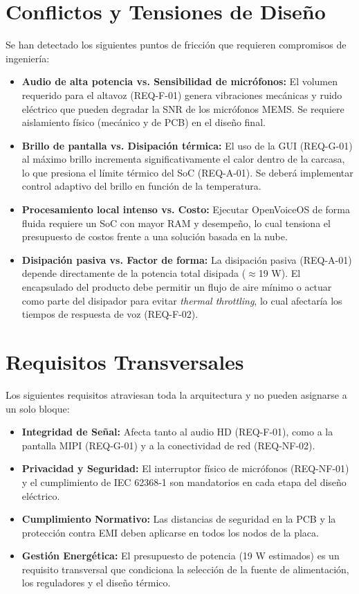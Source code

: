 \documentclass[%
	paper=a4,
	twoside=false,
	parskip=half,
	chapterprefix=false,
	10pt,
	headings=normal,
	bibliography=totoc,
	listof=totoc,
	titlepage=on,
	captions=tableabove,
	draft=false, 
]{scrbook}%
\begin{document}
\section{Conflictos y Tensiones de Diseño}

Se han detectado los siguientes puntos de fricción que requieren compromisos de ingeniería:

\begin{itemize}
    \item \textbf{Audio de alta potencia vs. Sensibilidad de micrófonos:} El volumen requerido para el altavoz (REQ-F-01) genera vibraciones mecánicas y ruido eléctrico que pueden degradar la SNR de los micrófonos MEMS. Se requiere aislamiento físico (mecánico y de PCB) en el diseño final.
    \item \textbf{Brillo de pantalla vs. Disipación térmica:} El uso de la GUI (REQ-G-01) al máximo brillo incrementa significativamente el calor dentro de la carcasa, lo que presiona el límite térmico del SoC (REQ-A-01). Se deberá implementar control adaptivo del brillo en función de la temperatura.
    \item \textbf{Procesamiento local intenso vs. Costo:} Ejecutar OpenVoiceOS de forma fluida requiere un SoC con mayor RAM y desempeño, lo cual tensiona el presupuesto de costos frente a una solución basada en la nube.
    \item \textbf{Disipación pasiva vs. Factor de forma:} La disipación pasiva (REQ-A-01) depende directamente de la potencia total disipada ($\approx$19 W). El encapsulado del producto debe permitir un flujo de aire mínimo o actuar como parte del disipador para evitar \textit{thermal throttling}, lo cual afectaría los tiempos de respuesta de voz (REQ-F-02).
\end{itemize}

\section{Requisitos Transversales}

Los siguientes requisitos atraviesan toda la arquitectura y no pueden asignarse a un solo bloque:

\begin{itemize}
    \item \textbf{Integridad de Señal:} Afecta tanto al audio HD (REQ-F-01), como a la pantalla MIPI (REQ-G-01) y a la conectividad de red (REQ-NF-02).
    \item \textbf{Privacidad y Seguridad:} El interruptor físico de micrófonos (REQ-NF-01) y el cumplimiento de IEC 62368-1 \cite{iec62368} son mandatorios en cada etapa del diseño eléctrico.
    \item \textbf{Cumplimiento Normativo:} Las distancias de seguridad en la PCB y la protección contra EMI deben aplicarse en todos los nodos de la placa.
    \item \textbf{Gestión Energética:} El presupuesto de potencia (19 W estimados) es un requisito transversal que condiciona la selección de la fuente de alimentación, los reguladores y el diseño térmico.
\end{itemize}
\end{document}
